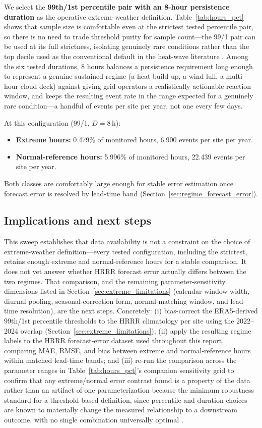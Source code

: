 We select the \textbf{99th/1st percentile pair with an 8-hour persistence duration} as the
operative extreme-weather definition. Table~\ref{tab:hours_pct} shows that sample size is
comfortable even at the strictest tested percentile pair, so there is no need to trade threshold
purity for sample count---the 99/1 pair can be used at its full strictness, isolating genuinely
rare conditions rather than the top decile used as the conventional default in the heat-wave
literature \citep{perkinsalexander2013}. Among the six tested durations, 8 hours balances a
persistence requirement long enough to represent a genuine sustained regime (a heat build-up, a
wind lull, a multi-hour cloud deck) against giving grid operators a realistically actionable
reaction window, and keeps the resulting event rate in the range expected for a genuinely rare
condition---a handful of events per site per year, not one every few days.

At this configuration (99/1, $D=8$\,h):
\begin{itemize}
  \item \textbf{Extreme hours:} \num{0.479}\% of monitored hours,
        \num{6.900} events per site per year.
  \item \textbf{Normal-reference hours:} \num{5.996}\% of monitored hours,
        \num{22.439} events per site per year.
\end{itemize}
Both classes are comfortably large enough for stable error estimation once forecast error is
resolved by lead-time band (Section~\ref{sec:regime_forecast_error}).

\subsection{Implications and next steps}

This sweep establishes that data availability is not a constraint on the choice of extreme-weather
definition---every tested configuration, including the strictest, retains enough extreme and
normal-reference hours for a stable comparison. It does not yet answer whether HRRR forecast error
actually differs between the two regimes. That comparison, and the remaining
parameter-sensitivity dimensions listed in Section~\ref{sec:extreme_limitations} (calendar-window
width, diurnal pooling, seasonal-correction form, normal-matching window, and lead-time
resolution), are the next steps. Concretely: (i) bias-correct the ERA5-derived 99th/1st percentile thresholds to
the HRRR climatology per site using the \num{2022}--\num{2024} overlap
(Section~\ref{sec:extreme_limitations}); (ii) apply the resulting regime labels to the HRRR
forecast-error dataset used throughout this report, comparing MAE, RMSE, and bias between
extreme and normal-reference hours within matched lead-time bands; and (iii) re-run the comparison
across the parameter ranges in Table~\ref{tab:hours_pct}'s companion sensitivity grid to confirm
that any extreme/normal error contrast found is a property of the data rather than an artifact of
one parameterization because the minimum robustness standard for a threshold-based definition, since
percentile and duration choices are known to materially change the measured relationship to a
downstream outcome, with no single combination universally optimal \citep{perkinsalexander2013,puvvula2022}.
